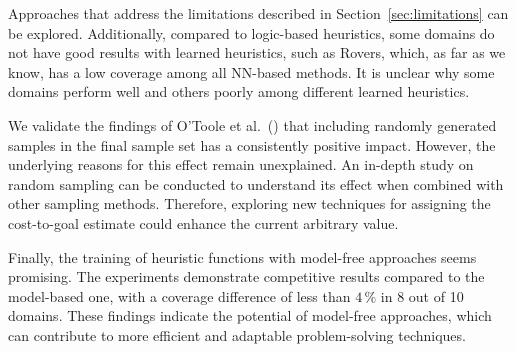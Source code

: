 Approaches that address the limitations described in Section~\ref{sec:limitations} can be explored. Additionally, compared to logic-based heuristics, some domains do not have good results with learned heuristics, such as Rovers, which, as far as we know, has a low coverage among all NN-based methods. It is unclear why some domains perform well and others poorly among different learned heuristics.

We validate the findings of O'Toole et al.~(\citeyear{OToole/2022}) that including randomly generated samples in the final sample set has a consistently positive impact. However, the underlying reasons for this effect remain unexplained. An in-depth study on random sampling can be conducted to understand its effect when combined with other sampling methods. Therefore, exploring new techniques for assigning the cost-to-goal estimate could enhance the current arbitrary value.

Finally, the training of heuristic functions with model-free approaches seems promising. The experiments demonstrate competitive results compared to the model-based one, with a coverage difference of less than $4\,\%$ in 8 out of 10 domains. These findings indicate the potential of model-free approaches, which can contribute to more efficient and adaptable problem-solving techniques.
